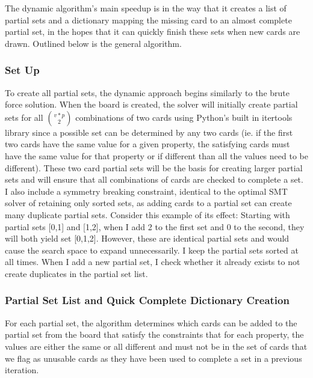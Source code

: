 \documentclass[pageno]{jpaper}
\begin{document}
The dynamic algorithm's main speedup is in the way that it creates a list of partial sets and a dictionary mapping the missing card to an almost complete partial set, in the hopes that it can quickly finish these sets when new cards are drawn. Outlined below is the general algorithm. 

\subsubsection{Set Up}

To create all partial sets, the dynamic approach begins similarly to the brute force solution. When the board is created, the solver will initially create partial sets for all ${v*p}\choose{2}$ combinations of two cards using Python's built in itertools library since a possible set can be determined by any two cards (ie. if the first two cards have the same value for a given property, the satisfying cards must have the same value for that property or if different than all the values need to be different). These two card partial sets will be the basis for creating larger partial sets and will ensure that all combinations of cards are checked to complete a set. I also include a symmetry breaking constraint, identical to the optimal SMT solver of retaining only sorted sets, as adding cards to a partial set can create many duplicate partial sets. Consider this example of its effect: Starting with partial sets [0,1] and [1,2], when I add 2 to the first set and 0 to the second, they will both yield set [0,1,2]. However, these are identical partial sets and would cause the search space to expand unnecessarily.  I keep the partial sets sorted at all times. When I add a new partial set, I check whether it already exists to not create duplicates in the partial set list.

\subsubsection{Partial Set List and Quick Complete Dictionary Creation}

For each partial set, the algorithm determines which cards can be added to the partial set from the board that satisfy the constraints that for each property, the values are either the same or all different and must not be in the set of cards that we flag as unusable cards as they have been used to complete a set in a previous iteration. 
\end{document}
